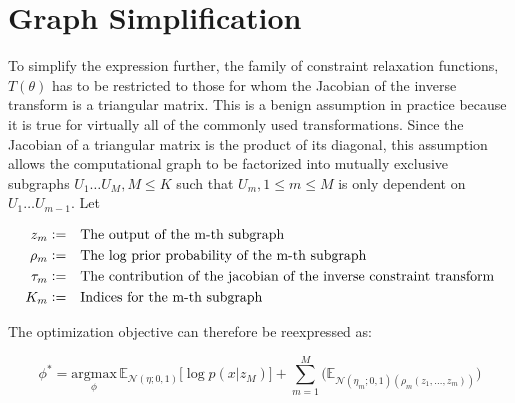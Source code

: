 \documentclass[10pt]{article}
\newcommand{\defeq}{\vcentcolon=}
\begin{document}
\section*{Graph Simplification}

To simplify the expression further, the family of constraint relaxation functions, $T(\theta)$ has to be restricted to those
for whom the Jacobian of the inverse transform is a triangular matrix. This is a benign assumption in practice because it is
true for virtually all of the commonly used transformations. Since the Jacobian of a triangular matrix is the product of 
its diagonal, this assumption allows the computational graph to be factorized into mutually exclusive subgraphs $U_1 \ldots U_M, M \leq K$
such that $U_m, 1 \le m \leq M$ is only dependent on $U_1 \ldots U_{m - 1}$. Let

\begin{align*}
  z_m \defeq&\quad \text{The output of the m-th subgraph} \\
  \rho_m \defeq&\quad \text{The log prior probability of the m-th subgraph} \\
  \tau_m \defeq&\quad \text{The contribution of the jacobian of the inverse constraint transform} \\
  K_m \defeq&\quad \text{Indices for the m-th subgraph}
\end{align*}

The optimization objective can therefore be reexpressed as:

\begin{equation*}
  \phi^* = \underset{\phi}{\text{argmax}} \, \mathbb{E}_{\mathcal{N}(\eta; 0, 1)}\big[\log p(x | z_M) \big] + \sum_{m=1}^{M}\Big(\mathbb{E}_{\mathcal{N}(\eta_m; 0, 1)(\rho_m(z_1, \ldots, z_m ))}\Big)
\end{equation*}
\end{document}
